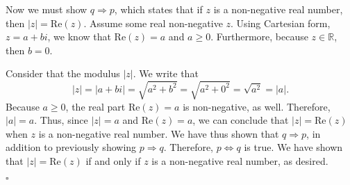 \documentclass[12pt]{exam}
\begin{document}
\begin{questions}
\begin{parts}
\par
Now we must show $q \Rightarrow p$, which states that if $z$ is a non-negative real number, then $|z| = \textrm{Re}(z)$. Assume some real non-negative $z$. Using Cartesian form, $z = a +bi$, we know that $\textrm{Re}(z) = a$ and $a \geq 0$. Furthermore, because $z \in \mathbb{R}$, then $b = 0$. 
\par
Consider that the modulus $|z|$. We write that  
\begin{equation*}
|z| = |a+bi| = \sqrt{a^2 + b^2} = \sqrt{a^2 + 0^2} = \sqrt{a^2} = |a|.
\end{equation*} 
Because $a \geq 0$, the real part $\textrm{Re}(z) = a$ is non-negative, as well. Therefore, $|a| = a$. Thus, since $|z| = a$ and $\textrm{Re}(z) = a$, we can conclude that $|z| = \textrm{Re}(z)$ when $z$ is a non-negative real number. We have thus shown that $q \Rightarrow p$, in addition to previously showing $p \Rightarrow q$. Therefore, $p \Leftrightarrow q$ is true. We have shown that $|z| = \textrm{Re}(z)$ if and only if $z$ is a non-negative real number, as desired.
\begin{flushright}
$\square$
\end{flushright}

\end{parts}
\end{questions}
\end{document}
